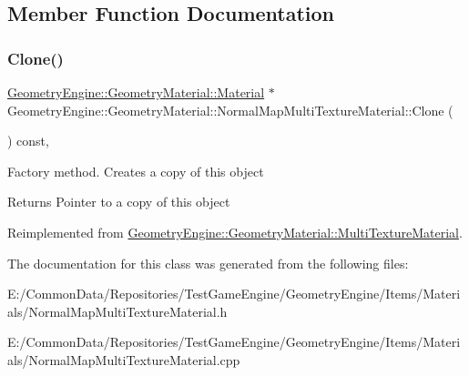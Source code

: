 \subsection{Member Function Documentation}
\mbox{\label{class_geometry_engine_1_1_geometry_material_1_1_normal_map_multi_texture_material_a38df455f7369f68ea2fc6abf31488c40}} 
\subsubsection{\texorpdfstring{Clone()}{Clone()}}
{\footnotesize\ttfamily \mbox{\hyperlink{class_geometry_engine_1_1_geometry_material_1_1_material}{Geometry\+Engine\+::\+Geometry\+Material\+::\+Material}} $\ast$ Geometry\+Engine\+::\+Geometry\+Material\+::\+Normal\+Map\+Multi\+Texture\+Material\+::\+Clone (\begin{DoxyParamCaption}{ }\end{DoxyParamCaption}) const\hspace{0.3cm}{\ttfamily [override]}, {\ttfamily [virtual]}}

Factory method. Creates a copy of this object \begin{DoxyReturn}{Returns}
Pointer to a copy of this object 
\end{DoxyReturn}


Reimplemented from \mbox{\hyperlink{class_geometry_engine_1_1_geometry_material_1_1_multi_texture_material_a66cef99b68270e1399830bc1b8bc8502}{Geometry\+Engine\+::\+Geometry\+Material\+::\+Multi\+Texture\+Material}}.



The documentation for this class was generated from the following files\+:\begin{DoxyCompactItemize}
\item 
E\+:/\+Common\+Data/\+Repositories/\+Test\+Game\+Engine/\+Geometry\+Engine/\+Items/\+Materials/Normal\+Map\+Multi\+Texture\+Material.\+h\item 
E\+:/\+Common\+Data/\+Repositories/\+Test\+Game\+Engine/\+Geometry\+Engine/\+Items/\+Materials/Normal\+Map\+Multi\+Texture\+Material.\+cpp\end{DoxyCompactItemize}
